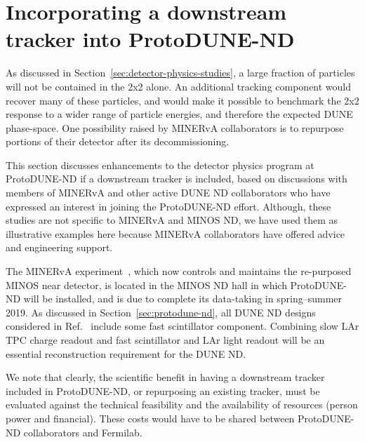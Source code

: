 \section{Incorporating a downstream tracker into ProtoDUNE-ND}
\label{sec:MINERvA}

As discussed in Section~\ref{sec:detector-physics-studies}, a large fraction of particles will not be contained in the 2x2 alone. An additional tracking component would recover many of these particles, and would make it possible to benchmark the 2x2 response to a wider range of particle energies, and therefore the expected DUNE phase-space. One possibility raised by MINERvA collaborators is to repurpose portions of their detector after its decommissioning.      

This section discusses enhancements to the detector physics program at ProtoDUNE-ND if a downstream tracker is included, based on discussions with members of MINERvA and other active DUNE ND collaborators who have expressed an interest in joining the ProtoDUNE-ND effort. Although, these studies are not specific to MINERvA and MINOS ND, we have used them as illustrative examples here because MINERvA collaborators have offered advice and engineering support.   

The MINERvA experiment~\cite{minerva-nim}, which now controls and maintains the re-purposed MINOS near detector, is located in the MINOS ND hall in which ProtoDUNE-ND will be installed, and is due to complete its data-taking in spring--summer 2019. As discussed in Section~\ref{sec:protodune-nd}, all DUNE ND designs considered in Ref.~\cite{dune_ndcsg} include some fast scintillator component. Combining slow LAr TPC charge readout and fast scintillator and LAr light readout will be an essential reconstruction requirement for the DUNE ND. 

We note that clearly, the scientific benefit in having a downstream tracker included in ProtoDUNE-ND, or repurposing an existing tracker, must be evaluated against the technical feasibility and the availability of resources (person power and financial). These costs would have to be shared between ProtoDUNE-ND collaborators and Fermilab. 

